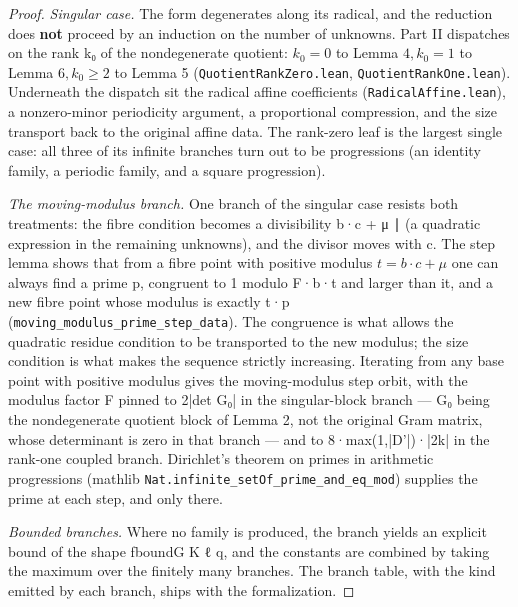 \documentclass[11pt]{article}
\theoremstyle{plain}
\theoremstyle{definition}
\theoremstyle{remark}
\theoremstyle{plain}
\theoremstyle{definition}
\theoremstyle{remark}
\newcounter{Part}
\theoremstyle{plain}
\theoremstyle{definition}
\theoremstyle{remark}
\begin{document}
\begin{proof}
\emph{Singular case.} The form degenerates along its radical, and the reduction does \textbf{not} proceed by an induction on the number of unknowns. Part II dispatches on the rank k₀ of the nondegenerate quotient: $k_{0} = 0$ to Lemma $4, k_{0} = 1$ to Lemma $6, k_{0} ≥ 2$ to Lemma 5 (\texttt{QuotientRankZero.\allowbreak{}lean}, \texttt{QuotientRankOne.\allowbreak{}lean}). Underneath the dispatch sit the radical affine coefficients (\texttt{RadicalAffine.\allowbreak{}lean}), a nonzero-minor periodicity argument, a proportional compression, and the size transport back to the original affine data. The rank-zero leaf is the largest single case: all three of its infinite branches turn out to be progressions (an identity family, a periodic family, and a square progression).

\emph{The moving-modulus branch.} One branch of the singular case resists both treatments: the fibre condition becomes a divisibility b·c + μ ∣ (a quadratic expression in the remaining unknowns), and the divisor moves with c. The step lemma shows that from a fibre point with positive modulus $t = b·c + μ$ one can always find a prime p, congruent to 1 modulo F·b·t and larger than it, and a new fibre point whose modulus is exactly t·p (\texttt{moving\_\allowbreak{}modulus\_\allowbreak{}prime\_\allowbreak{}step\_\allowbreak{}data}). The congruence is what allows the quadratic residue condition to be transported to the new modulus; the size condition is what makes the sequence strictly increasing. Iterating from any base point with positive modulus gives the moving-modulus step orbit, with the modulus factor F pinned to 2|det G₀| in the singular-block branch — G₀ being the nondegenerate quotient block of Lemma 2, not the original Gram matrix, whose determinant is zero in that branch — and to 8·max(1,|D'|)·|2k| in the rank-one coupled branch. Dirichlet's theorem on primes in arithmetic progressions (mathlib \texttt{Nat.\allowbreak{}infinite\_\allowbreak{}setOf\_\allowbreak{}prime\_\allowbreak{}and\_\allowbreak{}eq\_\allowbreak{}mod}) supplies the prime at each step, and only there.

\emph{Bounded branches.} Where no family is produced, the branch yields an explicit bound of the shape fboundG K ℓ q, and the constants are combined by taking the maximum over the finitely many branches. The branch table, with the kind emitted by each branch, ships with the formalization.

\end{proof}
\end{document}
